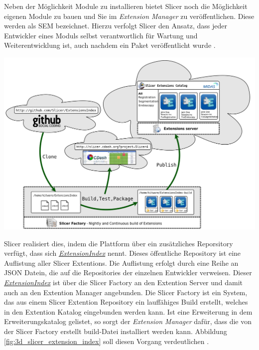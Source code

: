 \begin{minipage}{0.30\textwidth}
	Neben der Möglichkeit Module zu installieren bietet Slicer noch die Möglichkeit
	eigenen Module zu bauen und Sie im \textit{Extension Manager} zu
	veröffentlichen. Diese werden als \ac{SEM} bezeichnet. Hierzu verfolgt Slicer den
	Ansatz, dass jeder Entwickler eines Moduls selbst verantwortlich für Wartung
	und Weiterentwicklung ist, auch nachdem ein Paket veröffentlicht wurde \citep[vgl.][]{slicer2024}.
\end{minipage}
\hfill
\begin{minipage}{0.60\textwidth}
	\centering
	\includegraphics[width=1\textwidth]{img/slicer_extention_index.png}
	\label{fig:3d_slicer_extension_index}
\end{minipage}

Slicer realisiert dies, indem die Plattform über ein zusätzliches Reporsitory
verfügt, dass sich \href{https://github.com/Slicer/ExtensionsIndex?tab=readme-ov-file}{\textit{ExtensionIndex}}
nennt. Dieses öffentliche Repository ist eine Auflistung aller Slicer Extentions.
Die Auflistung erfolgt durch eine Reihe an \ac{JSON} Datein, die auf die Repositories
der einzelnen Entwickler verweisen. Dieser
\href{https://github.com/Slicer/ExtensionsIndex?tab=readme-ov-file}{\textit{ExtensionIndex}}
ist über die Slicer Factory an den Extention Server und damit auch an den
Extention Manager angebunden. Die Slicer Factory ist ein System, das aus einem
Slicer Extention Repository ein lauffähiges Build erstellt, welches in den Extention
Katalog eingebunden werden kann. Ist eine Erweiterung in dem Erweiterungskatalog
gelistet, so sorgt der \textit{Extension Manager} dafür, dass die von der Slicer
Factory erstellt build-Datei installiert werden kann. Abbildung
\ref{fig:3d_slicer_extension_index} soll diesen Vorgang verdeutlichen \citep[vgl.][]{slicer2024}.


